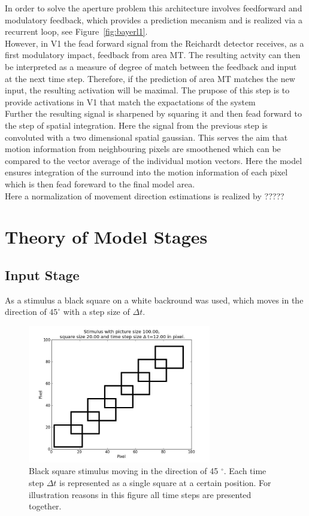 \documentclass[a4paper]{article}
\begin{document}
In order to solve the aperture problem this architecture involves feedforward and modulatory feedback, which provides a prediction mecanism and is realized via a recurrent loop, see Figure~\ref{fig:bayerl1}.\\
However, in V1 the fead forward signal from the Reichardt detector receives, as a first modulatory impact, feedback from area MT. The resulting actvity can then be interpreted as a measure of degree of match between the feedback and input at the next time step. Therefore, if the prediction of area MT matches the new input, the resulting activation will be maximal. The prupose of this step is to provide activations in V1 that match the expactations of the system\\
Further the resulting signal is sharpened by squaring it and then fead forward to the step of spatial integration. Here the signal from the previous step is convoluted with a two dimensional spatial gaussian. This serves the aim that motion information from neighbouring pixels are smoothened which can be compared to the vector average of the individual motion vectors. Here the model ensures integration of the surround into the motion information of each pixel which is then fead foreward to the final model area.\\
Here a normalization of movement direction estimations is realized by ?????

\section{Theory of Model Stages}
\subsection{Input Stage}
As a stimulus a black square on a white backround was used, which moves in the direction of $45^{\circ}$ with a step size of $\Delta t$.

\vspace{0.5cm}
\begin{figure}[ht]
\centering
\includegraphics[width=8cm]{pics/stimulus}
\caption{Black square stimulus moving in the direction of 45 $^{\circ}$. Each time step $\Delta t$ is represented as a single square at a certain position. For illustration reasons in this figure all time steps are presented together.}
\label{fig:stimulus}
\end{figure}
\vspace{0.5cm}
\end{document}

